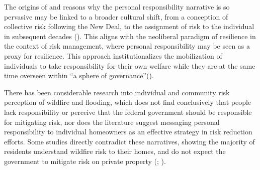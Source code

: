 \documentclass[
]{article}
\begin{document}
The origins of and reasons why the personal responsibility narrative is so pervasive may be linked to a broader cultural shift, from a conception of collective risk following the New Deal, to the assignment of risk to the individual in subsequent decades (). This aligns with the neoliberal paradigm of resilience in the context of risk management, where personal responsibility may be seen as a proxy for resilience. This approach institutionalizes the mobilization of individuals to take responsibility for their own welfare while they are at the same time overseen within ``a sphere of governance''().

There has been considerable research into individual and community risk perception of wildfire and flooding, which does not find conclusively that people lack responsibility or perceive that the federal government should be responsible for mitigating risk, nor does the literature suggest messaging personal responsibility to individual homeowners as an effective strategy in risk reduction efforts. Some studies directly contradict these narratives, showing the majority of residents understand wildfire risk to their homes, and do not expect the government to mitigate risk on private property (; ).
\end{document}
